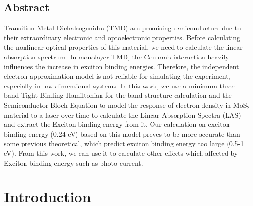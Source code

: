\documentclass[12pt,english,a4paper]{article}
\begin{document}
\subsection*{Abstract}
\quad Transition Metal Dichalcogenides (TMD) are promising semiconductors due to their extraordinary electronic and optoelectronic properties. Before calculating the nonlinear optical properties of this material, we need to calculate the linear absorption spectrum. In monolayer TMD, the Coulomb interaction heavily influences the increase in exciton binding energies. Therefore, the independent electron approximation model is not reliable for simulating the experiment, especially in low-dimensional systems. In this work, we use a minimum three-band Tight-Binding Hamiltonian for the band structure calculation and the Semiconductor Bloch Equation to model the response of electron density in $\mathrm{MoS}_2$ material to a laser over time to calculate the Linear Absorption Spectra (LAS) and extract the Exciton binding energy from it. Our calculation on exciton binding energy (0.24 eV) based on this model proves to be more accurate than some previous theoretical, which predict exciton binding energy too large (0.5-1 eV). From this work, we can use it to calculate other effects which affected by Exciton binding energy such as photo-current.
	\newpage
	\section{Introduction}
\end{document}
